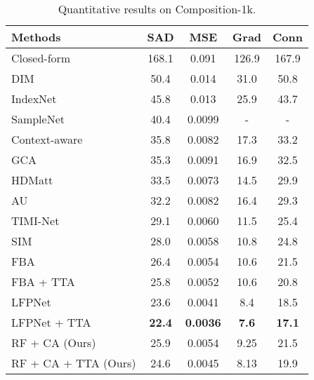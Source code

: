 \documentclass{article}
\theoremstyle{plain}
\begin{document}
\begin{table}[t]
\centering
    \caption{
        Quantitative results on Composition-1k.
}
    \label{table2}
\setlength\tabcolsep{4pt}
\begin{tabular}{|l|cccc|}
    \hline
    Methods & SAD & MSE & Grad & Conn  
  \\
    \hline
    Closed-form \cite{Levin2008AClosed-Form} & 168.1 & 0.091 &126.9 & 167.9
    \\
    DIM \cite{Xu2017DeepImageMatting} & 50.4 & 0.014 & 31.0 & 50.8
    \\
    IndexNet \cite{Lu2019IndicesMatter} & 45.8 & 0.013 & 25.9 & 43.7
    \\
    SampleNet \cite{Tang2019Learning-Based} & 40.4 & 0.0099 & - & -
    \\
    Context-aware \cite{Houjj2019ContextAwareImageMatting} & 35.8 & 0.0082 & 17.3 & 33.2
    \\
    GCA \cite{Li2020NaturalImageMatting} 
    & 35.3 & 0.0091 & 16.9 & 32.5
    \\
    HDMatt \cite{Yu2021High-ResolutionDeepImageMatting}
    & 33.5 & 0.0073 & 14.5 & 29.9
    \\
    AU \cite{Dai2021LearningAffinityAware}
    & 32.2 & 0.0082 & 16.4 & 29.3
    \\
    TIMI-Net \cite{Liu2021TripartiteInformationMining} & 29.1 & 0.0060 & 11.5 & 25.4
    \\
    SIM \cite{Sun2021SemanticImageMatting} & 28.0 & 0.0058 & 10.8 & 24.8
    \\
    FBA \cite{Forte2020FBA} & 26.4 & 0.0054 & 10.6 & 21.5
    \\
    FBA + TTA \cite{Forte2020FBA} &  25.8 & 0.0052 & 10.6 & 20.8
    \\
    LFPNet \cite{Liu2021Long-RangeFeaturePropagating} 
                                  & 23.6 & 0.0041 & 8.4 & 18.5
                                  \\
    LFPNet + TTA \cite{Liu2021Long-RangeFeaturePropagating} 
                                  & \textbf{22.4} & \textbf{0.0036} & \textbf{7.6} & \textbf{17.1}
    \\
    \hline
    RF + CA (Ours) &
            25.9 & 0.0054 & 9.25 & 21.5
            \\
    RF + CA + TTA (Ours) &
            24.6 & 0.0045 & 8.13 & 19.9
\\
    \hline
\end{tabular}
\end{table}
\end{document}
